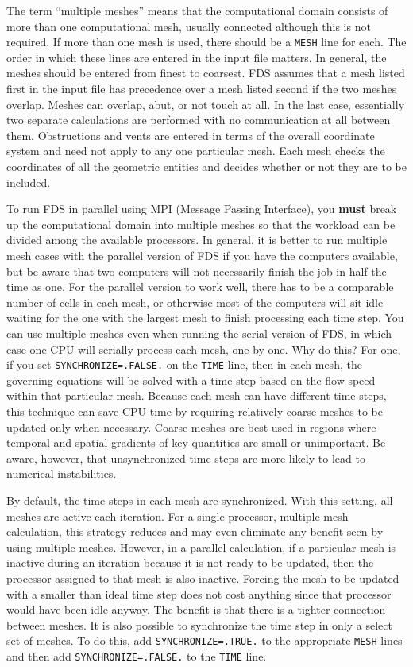 \documentclass[11pt]{book}
\newcommand{\ct}{\tt\small}
\begin{document}
The term ``multiple meshes'' means that the computational domain consists of
more than one computational mesh, usually connected although this is not
required. If more than one mesh is used, there should be a
{\ct MESH} line for each. The order in which these
lines are entered in the input file matters. In general, the meshes should be entered
from finest to coarsest. FDS assumes that a mesh listed first in the input file has
precedence over a mesh listed second if the two meshes overlap.
Meshes can overlap, abut, or not touch at all. In the last case, essentially two separate
calculations are performed with no communication at all between them. Obstructions and vents are entered
in terms of the overall coordinate system and need not apply to any one particular mesh.
Each mesh checks the coordinates of all the geometric
entities and decides whether or not they are to be included.

To run FDS in parallel using MPI (Message Passing Interface), you {\bf must} break up the computational domain into
multiple meshes so that the workload can be divided among the available processors.
In general, it is better to run multiple mesh cases with the parallel version of FDS if you have the
computers available, but be aware that two computers will not necessarily finish the job in half the time as one. For the
parallel version to work well, there has to be a comparable number of cells in each mesh, or otherwise most of the computers will sit idle
waiting for the one with the largest mesh to finish processing each time step. You can use multiple meshes even when running the serial version of FDS,
in which case one CPU will serially process each mesh, one by one. Why do this?
For one, if you set {\ct SYNCHRONIZE=.FALSE.} on the {\ct TIME} line,
then in each mesh, the governing equations will be solved with a time
step based on the flow speed within that particular mesh. Because each
mesh can have different time steps, this technique can save CPU time by
requiring relatively coarse meshes to be updated only when necessary.
Coarse meshes are best used in regions where temporal and spatial gradients of key
quantities are small or unimportant. Be aware, however, that unsynchronized time steps are more likely to lead to numerical instabilities.

By default, the time steps in each mesh are synchronized.
With this setting, all meshes are active each iteration.
For a single-processor, multiple mesh calculation, this strategy reduces
and may even eliminate any benefit seen by using multiple meshes. However, in a
parallel calculation, if a particular mesh is inactive during an iteration because
it is not ready to be updated, then the processor assigned to that mesh is also
inactive. Forcing the mesh to be updated with a smaller than ideal time step does not
cost anything since that processor would have been idle anyway. The benefit is that
there is a tighter connection between meshes.
It is also possible to synchronize the time step in only a select set of meshes. To do
this, add {\ct SYNCHRONIZE=.TRUE.} to the appropriate {\ct MESH} lines and then add
{\ct SYNCHRONIZE=.FALSE.} to the {\ct TIME} line.
\end{document}
